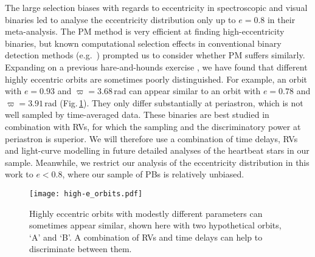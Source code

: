 \documentclass[a4paper,fleqn,usenatbib]{mnras}
\begin{document}
The large selection biases with regards to eccentricity in spectroscopic and visual binaries led \citet{moe&distefano2017} to analyse the eccentricity distribution only up to $e=0.8$ in their meta-analysis. The PM method is very efficient at finding high-eccentricity binaries, but known computational selection effects in conventional binary detection methods (e.g.\ \citealt{finsen1936,shen&turner2008,hoggetal2010b,tokovinin&kiyaeva2016}) prompted us to consider whether PM suffers similarly. Expanding on a previous hare-and-hounds exercise \citep{murphyetal2016b}, we have found that different highly eccentric orbits are sometimes poorly distinguished. For example, an orbit with $e=0.93$ and $\varpi=3.68$\,rad can appear similar to an orbit with $e=0.78$ and $\varpi=3.91$\,rad (Fig.\,\ref{fig:high-e_orbits}). They only differ substantially at periastron, which is not well sampled by time-averaged data. These binaries are best studied in combination with RVs, for which the sampling and the discriminatory power at periastron is superior. We will therefore use a combination of time delays, RVs and light-curve modelling in future detailed analyses of the heartbeat stars in our sample. Meanwhile, we restrict our analysis of the eccentricity distribution in this work to $e < 0.8$, where our sample of PBs is relatively unbiased.

\begin{figure}
\begin{center}
\texttt{[image: high-e\_orbits.pdf]}
\caption{Highly eccentric orbits with modestly different parameters can sometimes appear similar, shown here with two hypothetical orbits, `A' and `B'. A combination of RVs and time delays can help to discriminate between them.}
\label{fig:high-e_orbits}
\end{center}
\end{figure}
\end{document}
